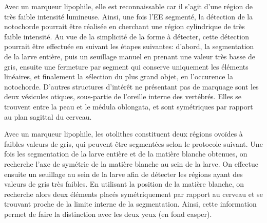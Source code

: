 \documentclass[\main/main.tex]{subfiles}
\begin{document}
Avec un marqueur lipophile, elle est reconnaissable car il s'agit d'une région de très faible intensité lumineuse. Ainsi, une fois l'EE segmenté,
la détection de la notochorde pourrait être réalisée en cherchant une région cylindrique de très faible intensité.
%
Au vue de la simplicité de la forme à détecter, cette détection pourrait être effectuée en suivant les étapes suivantes: d'abord, la segmentation de la larve entière, puis un seuillage manuel en prenant une valeur très basse de gris, ensuite une fermeture par segment qui conserve uniquement les éléments linéaires, et finalement la sélection du plus grand objet, en l'occurence la notochorde.
D'autres structures d'intérêt ne présentant pas de marquage sont les deux vésicules otiques, sous-partie de l'oreille interne des vertébrés. Elles se trouvent entre la peau et le médula oblongata, et sont symétriques par rapport au plan sagittal du cerveau.

%
Avec un marqueur lipophile, les otolithes constituent deux régions ovoïdes à faibles valeurs de gris, qui peuvent être segmentées selon le protocole suivant.
Une fois les segmentation de la larve entière et de la matière blanche obtenues, on recherche l'axe de symétrie de la matière blanche au sein de la larve. On effectue ensuite un seuillage au sein de la larve afin de détecter les régions ayant des valeurs de gris très faibles. En utilisant la position de la matière blanche, on recherche alors deux éléments placés symétriquement par rapport au cerveau et se trouvant proche de la limite interne de la segmentation. Ainsi, cette information permet de faire la distinction avec les deux yeux (en fond casper).

\end{document}

